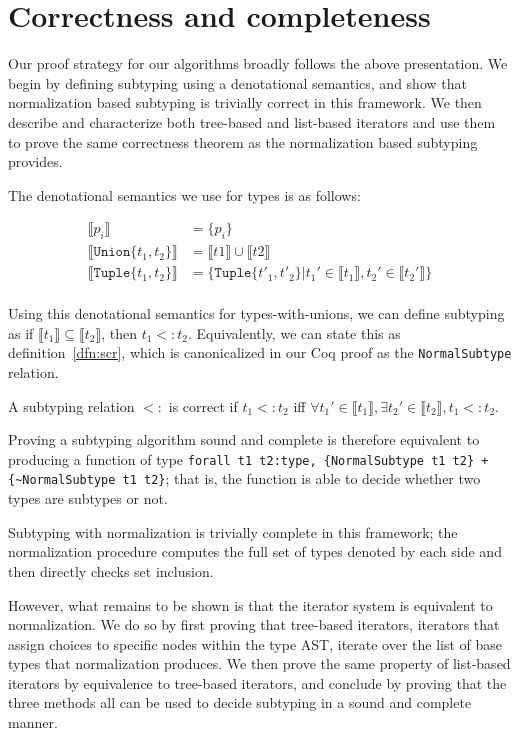 \documentclass[a4paper,english]{lipics-v2019}
\newcommand{\xt}[1]{\texttt{#1}}
\newcommand{\tuplet}[2]{\xt{Tuple\{}#1,#2\xt{\}}}
\newcommand{\union}[2]{\xt{Union\{}#1,#2\xt{\}}}
\newcommand{\denotes}[1]{\llbracket #1 \rrbracket}
\begin{document}
\section{Correctness and completeness}

Our proof strategy for our algorithms broadly follows the above presentation.
We begin by defining subtyping using a denotational semantics, and show that
normalization based subtyping is trivially correct in this framework. We then
describe and characterize both tree-based and list-based iterators and use
them to prove the same correctness theorem as the normalization based
subtyping provides.

The denotational semantics we use for types is as follows:

\begin{align*}
\denotes{p_i} &= \{p_i\} \\
\denotes{\union{t_1}{t_2}} &= \denotes{t1} \cup \denotes{t2} \\
\denotes{\tuplet{t_1}{t_2}} &= \{\tuplet{t'_1}{t'_2} | t_1' \in \denotes{t_1},  t_2' \in \denotes{t_2'}\} \\
\end{align*}

Using this denotational semantics for types-with-unions, we can define
subtyping as if $\denotes{t_1} \subseteq \denotes{t_2}$, then $t_1 <: t_2$.
Equivalently, we can state this as definition~\ref{dfn:scr}, which is canonicalized
in our Coq proof as the \verb|NormalSubtype| relation.

\begin{definition}
A subtyping relation $<:$ is correct if $t_1 <: t_2$ iff $\forall t_1' \in \denotes{t_1},
\exists t_2' \in \denotes{t_2}, t_1 <: t_2$.
\label{dfn:scr}
\end{definition}

Proving a subtyping algorithm sound and complete is therefore equivalent to
producing a function of type \verb|forall t1 t2:type, {NormalSubtype t1 t2} + {~NormalSubtype t1 t2}|; 
that is, the function is able to decide whether two types are
subtypes or not.

Subtyping with normalization is trivially complete in this framework; the normalization
procedure computes the full set of types denoted by each side and then directly checks
set inclusion.

However, what remains to be shown is that the iterator system is equivalent to normalization.
We do so by first proving that tree-based iterators, iterators that assign choices to specific
nodes within the type AST, iterate over the list of base types that normalization produces. We
then prove the same property of list-based iterators by equivalence to tree-based iterators, and
conclude by proving that the three methods all can be used to decide subtyping in a sound and complete
manner.
\end{document}
